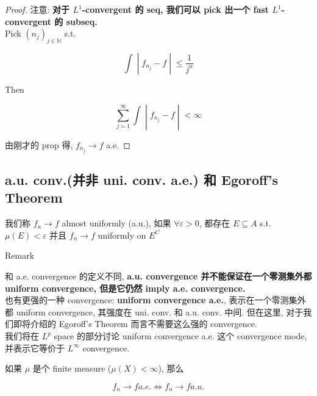 \begin{proof}

注意: \textbf{对于 \(L^{1}\)-convergent 的 seq, 我们可以 pick 出一个 fast \(L^{1}\)-convergent 的 subseq.}\\
Pick \((n_{j})_{j \in \mathbb{N}}\) s.t.

\[\left. \int \middle| f_{n_{j}} - f \middle| \leq \frac{1}{j^{n}} \right.\]

Then

\[\left. \sum\limits_{j = 1}^{\infty}\int \middle| f_{n_{j}} - f \middle| < \infty \right.\]

由刚才的 prop 得, \(f_{n_{j}}\rightarrow f\) a.e.

\end{proof}

\subsection{a.u. conv.(并非 uni. conv. a.e.) 和 Egoroff's Theorem}\label{a.u.-conv.ux5e76ux975e-uni.-conv.-a.e.-ux548c-egoroffs-theorem}

\begin{definition}

我们称 \(f_{n}\rightarrow f\) almost uniformly (a.u.), 如果 \(\forall\varepsilon > 0\), 都存在 \(E \subseteq A\) s.t. \(\mu(E) < \varepsilon\) 并且 \(f_{n}\rightarrow f\) uniformly on \(E^{C}\)

\end{definition}

\begin{qlremark}{Remark}

和 a.e. convergence 的定义不同, \textbf{a.u. convergence 并不能保证在一个零测集外都 uniform convergence, 但是它仍然 imply a.e. convergence.}\\
也有更强的一种 convergence: \textbf{uniform convergence a.e.}, 表示在一个零测集外都 uniform convergence, 其强度在 uni. conv. 和 a.u. conv. 中间. 但在这里, 对于我们即将介绍的 Egoroff's Theorem 而言不需要这么强的 convergence.\\
我们将在 \(L^{p}\) space 的部分讨论 uniform convergence a.e. 这个 convergence mode, 并表示它等价于 \(L^{\infty}\) convergence.

\end{qlremark}

\begin{theorem}{}

如果 \(\mu\) 是个 finite measure (\(\mu(X) < \infty\)), 那么

\[f_{n}\rightarrow f a.e.\Leftrightarrow f_{n}\rightarrow f a.u.\]

\end{theorem}

